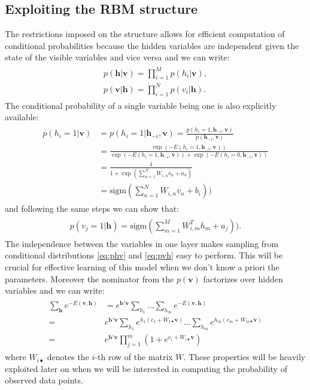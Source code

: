\subsection{Exploiting the RBM structure}
The restrictions imposed on the structure allows for efficient computation of conditional probabilities because the hidden variables are independent given the state of the visible variables and vice versa and we can write:
\begin{align}
\begin{split}
p(\mathbf{h}| \mathbf{v}) = \prod_{i = 1}^{M} p(h_i |\mathbf{v}), \\
p(\mathbf{v}| \mathbf{h}) = \prod_{i = 1}^{N} p(v_i |\mathbf{h}).
\end{split}
\end{align}
The conditional probability of a single variable being one is also explicitly available: 
\begin{align}
\begin{split}
p(h_i = 1| \mathbf{v})& = p(h_i = 1| \mathbf{h}_{-i}, \mathbf{v}) = \frac{p(h_i = 1, \mathbf{h}_{-i}, \mathbf{v})}{p( \mathbf{h}_{-i}, \mathbf{v})} \\
& = \frac{\exp( -E(h_i=1,\mathbf{h}_{-i}, \mathbf{v})) }{\exp( -E(h_i=1,\mathbf{h}_{-i}, \mathbf{v})) + \exp( -E(h_i=0,\mathbf{h}_{-i}, \mathbf{v}))}\\
& = \frac{1}{1 + \exp( \sum_{n=1}^N W_{i,n} v_n + a_n)}\\
& = \text{sigm} (\sum_{n=1}^N W_{i,n} v_n + b_i))
\end{split}
\label{eq:phv}
\end{align}
and following the same steps we can show that:
 \begin{align}
\begin{split}
p(v_j = 1| \mathbf{h})=  \text{sigm} (\sum_{m=1}^M W^T_{i,m} h_m + a_j)).
\end{split}
\label{eq:pvh}
\end{align}
The independence between the variables in one layer makes sampling from conditional distributions \ref{eq:phv} and \ref{eq:pvh} easy to perform. This will be crucial for effective learning of this model when we don't know a priori the parameters. Moreover the nominator from the $p(\mathbf{v})$ factorizes over hidden variables and we can write:
\begin{align}
\begin{split}
 \sum_\mathbf{h} e^{-E(\mathbf{v}, \mathbf{h})} & = e^{\mathbf{b}'\mathbf{v}}\sum_{h_1}...\sum_{h_m}e^{-E(\mathbf{v}, \mathbf{h})} \\
=&  e^{\mathbf{b}'\mathbf{v}} \sum_{h_1} e^{h_1 (c_1 + W_{1\bullet}\mathbf{v})}... \sum_{h_m} e^{h_m (c_m + W_{m\bullet}\mathbf{v})} \\
= & e^{\mathbf{b}'\mathbf{v}} \prod_{j=1}^{m} \left( 1 + e^{c_i + W_{i\bullet}\mathbf{v}} \right)
\label{eq:clampedFreeEnergy}
\end{split}
\end{align}
where $W_{i\bullet}$ denotes the $i$-th row of the matrix $W$. These properties will be heavily exploited later on when we will be interested in computing the probability of observed data points. 
